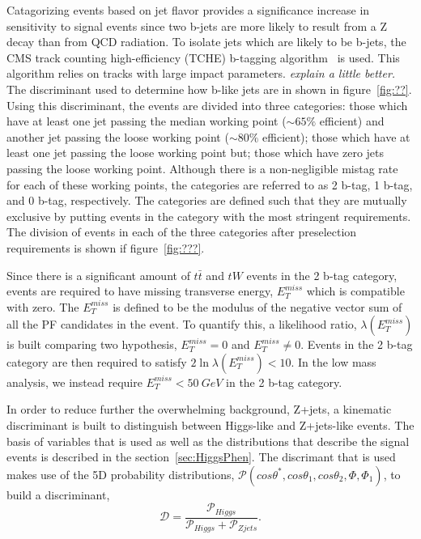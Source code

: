 Catagorizing events based on jet flavor provides a significance 
increase in sensitivity to signal events since two b-jets are 
more likely to result from a Z decay than from QCD radiation.  
To isolate jets which are likely to be b-jets, the CMS track 
counting high-efficiency (TCHE) b-tagging algorithm~\cite{???} 
is used.  This algorithm relies on tracks with large impact 
parameters. {\it explain a little better.} The discriminant used
to determine how b-like jets are in shown in figure~\ref{fig:??}.
Using this discriminant, the events are divided into three
categories: those which have at least one jet passing the median 
working point ($\sim65\%$ efficient) and another jet passing the
loose working point ($\sim80\%$ efficient); those which have at 
least one jet passing the loose working point but; those which 
have zero jets passing the loose working point.  Although there 
is a non-negligible mistag rate for each of these working points, 
the categories are referred to as 2 b-tag, 1 b-tag, and 
0 b-tag, respectively. The categories are defined such that 
they are mutually exclusive by putting events in the category 
with the most stringent requirements.  The division of events
in each of the three categories after preselection requirements
is shown if figure~\ref{fig:???}.

Since there is a significant amount of $t\bar{t}$ and $tW$ 
events in the 2 b-tag category, events are required to have
missing transverse energy, $E_T^{miss}$ which is compatible with 
zero.  The $E_T^{miss}$ is defined to be the modulus of the 
negative vector sum of all the PF candidates in the event.  
To quantify this, a likelihood ratio, $\lambda(E_T^{miss})$ 
is built comparing two hypothesis, $E_T^{miss}=0$ and 
$E_T^{miss}\neq 0$.  Events in the 2 b-tag category are then 
required to satisfy $2\ln\lambda(E_T^{miss})<10$.  In the 
low mass analysis, we instead require $E_T^{miss}<50~GeV$ in
the 2 b-tag category.    

In order to reduce further the overwhelming background, Z+jets,
a kinematic discriminant is built to distinguish between
Higgs-like and Z+jets-like events.  The basis of variables 
that is used as well as the distributions that describe the 
signal events is described in the section~\ref{sec:HiggsPhen}.
The discrimant that is used makes use of the 5D probability 
distributions, 
$\mathscr{P}(cos\theta^*,cos\theta_1,cos\theta_2,\Phi,\Phi_1)$,
to build a discriminant,
\begin{equation}
\mathscr{D} = \frac{\mathscr{P}_{Higgs}}{\mathscr{P}_{Higgs}+\mathscr{P}_{Zjets}}.
\label{eq:KD}
\end{equation}


